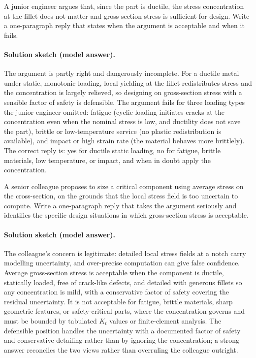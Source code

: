 \begin{exercise}
A junior engineer argues that, since the part is ductile, the
stress concentration at the fillet does not matter and gross-section
stress is sufficient for design. Write a one-paragraph reply that
states when the argument is acceptable and when it fails.
\paragraph{Solution sketch (model answer).} The argument is partly
right and dangerously incomplete. For a ductile metal under static,
monotonic loading, local yielding at the fillet redistributes stress
and the concentration is largely relieved, so designing on gross-section
stress with a sensible factor of safety is defensible. The argument
fails for three loading types the junior engineer omitted: fatigue
(cyclic loading initiates cracks at the concentration even when the
nominal stress is low, and ductility does not save the part), brittle
or low-temperature service (no plastic redistribution is available), and
impact or high strain rate (the material behaves more brittlely). The
correct reply is: yes for ductile static loading, no for fatigue,
brittle materials, low temperature, or impact, and when in doubt apply
the concentration.
\end{exercise}

\begin{exercise}
A senior colleague proposes to size a critical component using
average stress on the cross-section, on the grounds that the local
stress field is too uncertain to compute. Write a one-paragraph
reply that takes the argument seriously and identifies the
specific design situations in which gross-section stress is
acceptable.
\paragraph{Solution sketch (model answer).} The colleague's concern is
legitimate: detailed local stress fields at a notch carry modelling
uncertainty, and over-precise computation can give false confidence.
Average gross-section stress is acceptable when the component is
ductile, statically loaded, free of crack-like defects, and detailed
with generous fillets so any concentration is mild, with a conservative
factor of safety covering the residual uncertainty. It is not
acceptable for fatigue, brittle materials, sharp geometric features, or
safety-critical parts, where the concentration governs and must be
bounded by tabulated $K_t$ values or finite-element analysis. The
defensible position handles the uncertainty with a documented factor of
safety and conservative detailing rather than by ignoring the
concentration; a strong answer reconciles the two views rather than
overruling the colleague outright.
\end{exercise}

